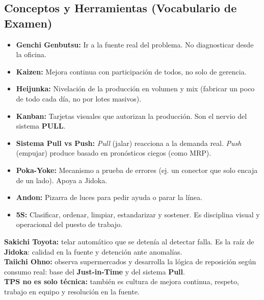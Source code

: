 \subsection{Conceptos y Herramientas (Vocabulario de Examen)}
\begin{itemize}[itemsep=1ex]
    \item \textbf{Genchi Genbutsu:} Ir a la fuente real del problema. No diagnosticar desde la oficina.
    \item \textbf{Kaizen:} Mejora continua con participación de todos, no solo de gerencia.
    \item \textbf{Heijunka:} Nivelación de la producción en volumen y mix (fabricar un poco de todo cada día, no por lotes masivos).
    \item \textbf{Kanban:} Tarjetas visuales que autorizan la producción. Son el nervio del sistema \textbf{PULL}.
    \item \textbf{Sistema Pull vs Push:} \textit{Pull} (jalar) reacciona a la demanda real. \textit{Push} (empujar) produce basado en pronósticos ciegos (como MRP).
    \item \textbf{Poka-Yoke:} Mecanismo a prueba de errores (ej. un conector que solo encaja de un lado). Apoya a Jidoka.
    \item \textbf{Andon:} Pizarra de luces para pedir ayuda o parar la línea.
    \item \textbf{5S:} Clasificar, ordenar, limpiar, estandarizar y sostener. Es disciplina visual y operacional del puesto de trabajo.
\end{itemize}

\begin{tcolorbox}[colback=blue!5!white,colframe=blue!70!black,title=Historia TPS que puede caer en V/F]
\textbf{Sakichi Toyota:} telar automático que se detenía al detectar falla. Es la raíz de \textbf{Jidoka}: calidad en la fuente y detención ante anomalías.\\
\textbf{Taiichi Ohno:} observa supermercados y desarrolla la lógica de reposición según consumo real: base del \textbf{Just-in-Time} y del sistema \textbf{Pull}.\\
\textbf{TPS no es solo técnica:} también es cultura de mejora continua, respeto, trabajo en equipo y resolución en la fuente.
\end{tcolorbox}

